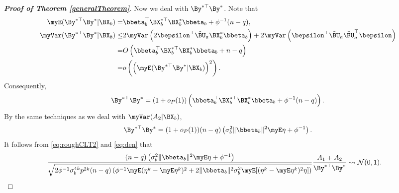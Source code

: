 \begin{proof}[\textbf{Proof of Theorem \ref{generalTheorem}}]
Now we deal with $\By^{*\top} \By^*$.
Note that
\begin{equation*}
    \begin{split}
        \myE (\By^{*\top} \By^* |\BX_b ) =& \bbeta_b^\top \BX_b^{*\top}  \BX_b^* \bbeta_b
    + \phi^{-1}(n-q),
    \\
    \myVar ( \By^{*\top} \By^* |\BX_b ) 
    \leq  &
    2\myVar \left( 2 \bepsilon^\top \tilde{\BU}_a  \BX_b^{*} \bbeta_b \right) + 2\myVar \left( \bepsilon^\top  \tilde{\BU}_a \tilde{\BU}_a^\top \bepsilon \right)
    \\
    =&O\left( 
        \bbeta_b^\top \BX_b^{*\top}  \BX_b^* \bbeta_b 
+ n-q\right)
\\
=&o\left( \left( \myE (\By^{*\top} \By^* |\BX_b ) \right)^2 \right).
    \end{split}
\end{equation*}
Consequently,
\begin{equation*}
    \By^{*\top} \By^* = (1+o_P(1))
    \left( 
        \bbeta_b^\top \BX_b^{*\top} \BX_b^* \bbeta_b
    + \phi^{-1}(n-q)
\right).
\end{equation*}
By the same techniques as we deal with $\myVar (A_2 |\BX_b)$,
\begin{equation}\label{eq:den}
        \By^{*\top} \By^*
        =
        (1+o_P(1))(n-q)\left(
        \sigma_b^2 \|\bbeta_b\|^2  \myE \eta
+\phi^{-1}
\right)
    .
    \end{equation}
It follows from \eqref{eq:roughCLT2} and \eqref{eq:den} that
    \begin{equation}\label{eq:roughCLT3}
        \begin{split}
    &
    \frac{
        (n-q)\left(
        \sigma_b^2 \|\bbeta_b\|^2  \myE \eta
+\phi^{-1}
\right)
    }{\sqrt{
            2\phi^{-1}
            \sigma_b^{4k} p^{2k}
            (n-q)
            \left( 
                \phi^{-1} \myE (\eta^k - \myE \eta^k)^2
                +
                2\|\bbeta_b\|^2 \sigma_b^2 \myE [(\eta^k - \myE \eta^k)^2\eta]
            \right)
    }}
    \frac{
        A_1+A_2
    }{\By^{*\top} \By^*}
    \rightsquigarrow \mathcal N(0,1).
        \end{split}
    \end{equation}


\end{proof}
